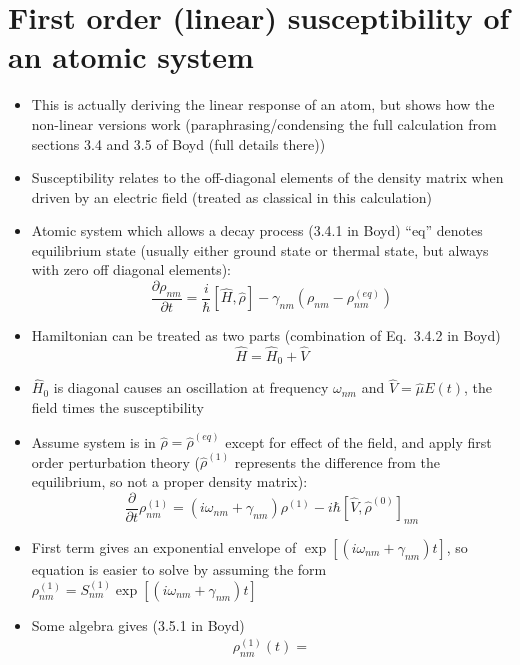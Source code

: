 \documentclass[english]{article}
\begin{document}
\section{First order (linear) susceptibility of an atomic system}
\begin{itemize}
\item This is actually deriving the linear response of an atom, but shows how the non-linear versions work (paraphrasing/condensing the full calculation from sections 3.4 and 3.5 of Boyd (full details there))
\item Susceptibility relates to the off-diagonal elements of the density matrix when driven by an electric field (treated as classical in this calculation)
\item Atomic system which allows a decay process (3.4.1 in Boyd) ``eq'' denotes equilibrium state (usually either ground state or thermal state, but always with zero off diagonal elements):
\begin{equation}
\frac{\partial \rho_{nm}}{\partial t}=\frac{i}{\hbar}\left[\hat{H},\hat{\rho}\right]-\gamma_{nm}\left(\rho_{nm}-\rho^{(eq)}_{nm}\right)
\end{equation}
\item Hamiltonian can be treated as two parts (combination of Eq.~3.4.2 in Boyd)
\begin{equation}
\hat{H}=\hat{H}_0+\hat{V}
\end{equation}
\item $\hat{H}_0$ is diagonal causes an oscillation at frequency $\omega_{nm}$ and $\hat{V}=\hat{\mu}E(t)$, the field times the susceptibility 
\item Assume system is in $\hat{\rho}=\hat{\rho}^{(eq)}$ except for effect of the field, and apply first order perturbation theory ($\hat \rho^{(1)}$ represents the difference from the equilibrium, so not a proper density matrix):
\begin{equation}
\frac{\partial}{\partial t}\rho_{nm}^{(1)}=(i\omega_{nm}+\gamma_{nm})\rho^{(1)}-i\hbar [\hat{V},\hat{\rho}^{(0)}]_{nm}
\end{equation}
\item First term gives an exponential envelope of $\exp\left[(i \omega_{nm}+\gamma_{nm})t \right]$, so equation is easier to solve by assuming the form $\rho_{nm}^{(1)}=S_{nm}^{(1)}\exp\left[(i \omega_{nm}+\gamma_{nm})t \right]$
\item Some algebra gives (3.5.1 in Boyd)
\begin{align}
\rho^{(1)}_{nm}(t)=\nonumber \\

\end{align}
\end{itemize}
\end{document}
